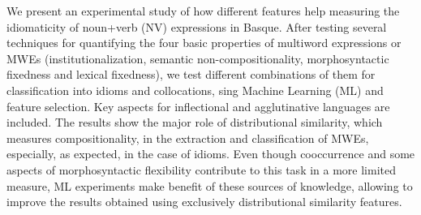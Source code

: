 We present an experimental study of how different features help measuring the idiomaticity of noun+verb (NV) expressions in Basque. After testing several
 techniques for quantifying the four basic properties of multiword expressions
 or MWEs (institutionalization, semantic non-compositionality, morphosyntactic
 fixedness and lexical fixedness), we test different combinations of them for
 classification into idioms and collocations, sing Machine Learning (ML) and
 feature selection. Key aspects for inflectional and agglutinative languages are
 included. The results show the major role of distributional similarity, which
 measures compositionality, in the extraction and classification of MWEs,
 especially, as expected, in the case of idioms. Even though cooccurrence and
 some aspects of morphosyntactic flexibility contribute to this task in a more
 limited measure, ML experiments make benefit of these sources of knowledge,
 allowing to improve the results obtained using exclusively distributional
 similarity features.

